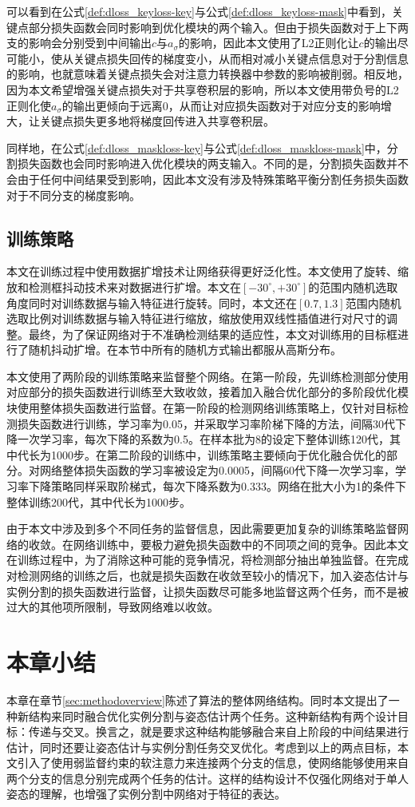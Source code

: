 可以看到在公式\eqref{def:dloss_keyloss-key}与公式\eqref{def:dloss_keyloss-mask}中看到，关键点部分损失函数会同时影响到优化模块的两个输入。但由于损失函数对于上下两支的影响会分别受到中间输出$c$与$a_{\sigma}$的影响，因此本文使用了L2正则化让$c$的输出尽可能小，使从关键点损失回传的梯度变小，从而相对减小关键点信息对于分割信息的影响，也就意味着关键点损失会对注意力转换器中参数的影响被削弱。相反地，因为本文希望增强关键点损失对于共享卷积层的影响，所以本文使用带负号的L2正则化使$a_{\sigma}$的输出更倾向于远离0，从而让对应损失函数对于对应分支的影响增大，让关键点损失更多地将梯度回传进入共享卷积层。

同样地，在公式\eqref{def:dloss_maskloss-key}与公式\eqref{def:dloss_maskloss-mask}中，分割损失函数也会同时影响进入优化模块的两支输入。不同的是，分割损失函数并不会由于任何中间结果受到影响，因此本文没有涉及特殊策略平衡分割任务损失函数对于不同分支的梯度影响。


\subsection{训练策略}
\label{subsec:trainingstrategy}

本文在训练过程中使用数据扩增技术让网络获得更好泛化性。本文使用了旋转、缩放和检测框抖动技术来对数据进行扩增。本文在$[-30^\circ, +30^\circ]$的范围内随机选取角度同时对训练数据与输入特征进行旋转。同时，本文还在$[0.7, 1.3]$范围内随机选取比例对训练数据与输入特征进行缩放，缩放使用双线性插值进行对尺寸的调整。最终，为了保证网络对于不准确检测结果的适应性，本文对训练用的目标框进行了随机抖动扩增。在本节中所有的随机方式输出都服从高斯分布。

本文使用了两阶段的训练策略来监督整个网络。在第一阶段，先训练检测部分使用对应部分的损失函数进行训练至大致收敛，接着加入融合优化部分的多阶段优化模块使用整体损失函数进行监督。在第一阶段的检测网络训练策略上，仅针对目标检测损失函数进行训练，学习率为0.05，并采取学习率阶梯下降的方法，间隔30代下降一次学习率，每次下降的系数为0.5。在样本批为8的设定下整体训练120代，其中代长为1000步。在第二阶段的训练中，训练策略主要倾向于优化融合优化的部分。对网络整体损失函数的学习率被设定为0.0005，间隔60代下降一次学习率，学习率下降策略同样采取阶梯式，每次下降系数为0.333。网络在批大小为1的条件下整体训练200代，其中代长为1000步。

由于本文中涉及到多个不同任务的监督信息，因此需要更加复杂的训练策略监督网络的收敛。在网络训练中，要极力避免损失函数中的不同项之间的竞争。因此本文在训练过程中，为了消除这种可能的竞争情况，将检测部分抽出单独监督。在完成对检测网络的训练之后，也就是损失函数在收敛至较小的情况下，加入姿态估计与实例分割的损失函数进行监督，让损失函数尽可能多地监督这两个任务，而不是被过大的其他项所限制，导致网络难以收敛。

\section{本章小结}
本章在章节\ref{sec:methodoverview}陈述了算法的整体网络结构。同时本文提出了一种新结构来同时融合优化实例分割与姿态估计两个任务。这种新结构有两个设计目标：传递与交叉。换言之，就是要求这种结构能够融合来自上阶段的中间结果进行估计，同时还要让姿态估计与实例分割任务交叉优化。考虑到以上的两点目标，本文引入了使用弱监督约束的软注意力来连接两个分支的信息，使网络能够使用来自两个分支的信息分别完成两个任务的估计。这样的结构设计不仅强化网络对于单人姿态的理解，也增强了实例分割中网络对于特征的表达。